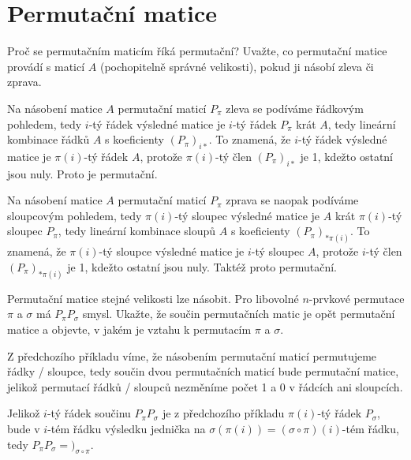 \documentclass[12pt]{article}					%
\begin{document}
\pagebreak

\section{Permutační matice}
    \begin{priklad}[2.1]
        Proč se permutačním maticím říká permutační? Uvažte, co permutační matice provádí s maticí $A$ (pochopitelně správné velikosti), pokud ji násobí zleva či zprava.

        \begin{reseni}
            Na násobení matice $A$ permutační maticí $P_{\pi}$ zleva se podíváme řádkovým pohledem, tedy $i$-tý řádek výsledné matice je $i$-tý řádek $P_{\pi}$ krát $A$, tedy lineární kombinace řádků $A$ s koeficienty $(P_{\pi})_{i*}$. To znamená, že $i$-tý řádek výsledné matice je $\pi(i)$-tý řádek $A$, protože $\pi(i)$-tý člen $(P_{\pi})_{i*}$ je 1, kdežto ostatní jsou nuly. Proto je permutační.

            Na násobení matice $A$ permutační maticí $P_{\pi}$ zprava se naopak podíváme sloupcovým pohledem, tedy $\pi(i)$-tý sloupec výsledné matice je $A$ krát $\pi(i)$-tý sloupec $P_{\pi}$, tedy lineární kombinace sloupů $A$ s koeficienty $(P_{\pi})_{*\pi(i)}$. To znamená, že $\pi(i)$-tý sloupce výsledné matice je $i$-tý sloupec $A$, protože $i$-tý člen $(P_{\pi})_{*\pi(i)}$ je 1, kdežto ostatní jsou nuly. Taktéž proto permutační.
        \end{reseni}
    \end{priklad}

    \begin{priklad}[2.2]
        Permutační matice stejné velikosti lze násobit. Pro libovolné $n$-prvkové permutace $\pi$ a $\sigma$ má $P_{\pi}P_{\sigma}$ smysl. Ukažte, že součin permutačních matic je opět permutační matice a objevte, v jakém je vztahu k permutacím $\pi$ a $\sigma$.
        
        \begin{reseni}
            Z předchozího příkladu víme, že násobením permutační maticí permutujeme řádky / sloupce, tedy součin dvou permutačních maticí bude permutační matice, jelikož permutací řádků / sloupců nezměníme počet 1 a 0 v řádcích ani sloupcích.

            Jelikož $i$-tý řádek součinu $P_{\pi}P_{\sigma}$ je z předchozího příkladu $\pi(i)$-tý řádek $P_{\sigma}$, bude v $i$-tém řádku výsledku jednička na $\sigma(\pi(i)) = (\sigma \circ \pi)(i)$-tém řádku, tedy $P_{\pi}P_{\sigma} = )_{\sigma \circ \pi}$.
        \end{reseni}
    \end{priklad}
\end{document}
